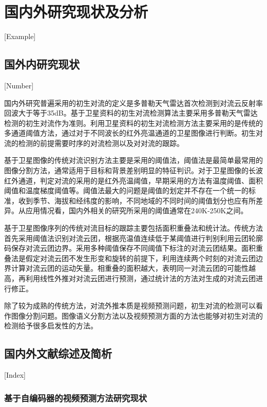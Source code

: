 
\chapter{国内外研究现状及分析}[Example]


\section{国外内研究现状}[Number]

国内外研究普遍采用的初生对流的定义是多普勒天气雷达首次检测到对流云反射率回波大于等于35dB。基于卫星资料的初生对流检测算法主要采用多普勒天气雷达检测的初生对流作为准则。利用卫星资料的初生对流检测方法主要采用的是传统的多通道阈值方法，通过对于不同波长的红外亮温通道的卫星图像进行判断。初生对流的检测的前提需要时序的对流检测以及对对流的跟踪。

基于卫星图像的传统对流识别方法主要是采用的阈值法\cite{覃丹宇2014利用静止气象卫星监测初生对流的研究进展}，阈值法是最简单最常用的图像分割方法，通常适用于目标和背景差别明显的特征判识。对于卫星图像的长波红外通道，判定对流的采用的是红外亮温阈值，早期采用的方法有温度阈值、面积阈值和温度梯度阈值等。阈值法最大的问题是阈值的划定并不存在一个统一的标准，收到季节、海拔和经纬度的影响，不同地域的不同时间的阈值划分也应有所差异。从应用情况看，国内外相关的研究所采用的阈值通常在240K-250K之间。

基于卫星图像序列的传统对流目标的跟踪主要包括面积重叠法和统计法\cite{张春桂2017基于卫星和雷达资料的对流云团识别跟踪}。传统方法首先采用阈值法识别对流云团，根据亮温值连续低于某阈值进行判别利用云团轮廓码保存对流云团边界。采用多种阈值保存不同阈值下标注的对流云团结果。面积重叠法是假定对流云团不发生形变和旋转的前提下，利用连续两个时刻的对流云团边界计算对流云团的运动矢量。相重叠的面积越大，表明同一对流云团的可能性越高，再利用线性外推对对流云团进行预测，通过统计法的方法对生成的对流云团进行修正。

除了较为成熟的传统方法，对流外推本质是视频预测问题，初生对流的检测可以看作图像分割问题。图像语义分割方法以及视频预测方面的方法也能够对初生对流的检测给予很多启发性的方法。



\section{国内外文献综述及简析}[Index]
\subsection{基于自编码器的视频预测方法研究现状}

